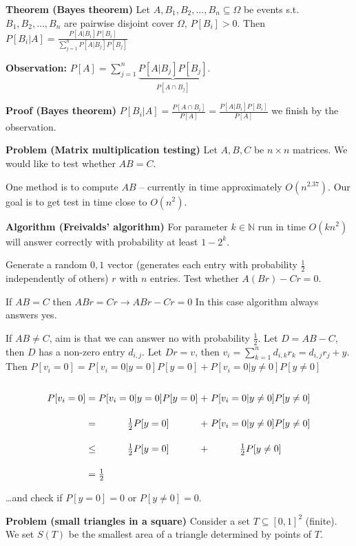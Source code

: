 \documentclass[a4paper]{article}
\begin{document}
\textbf{Theorem (Bayes theorem)}
Let $A, B_1, B_2, \ldots, B_n \subseteq \Omega$ be events s.t. $B_1, B_2, \ldots, B_n$ are pairwise disjoint cover $\Omega$, $P[B_i] > 0$.
Then $P[B_i|A] = \frac{P[A | B_i] P[B_i]}{\sum_{j=1}^n P[A|B_j] P[B_j]}$

\textbf{Observation:}
$P[A] = \sum_{j=1}^n \underbrace{P[A|B_j] P[B_j]}_{P[A \cap B_j]}$.

\textbf{Proof (Bayes theorem)}
$P[B_i|A] = \frac{P[A \cap B_i]}{P[A]} = \frac{P[A|B_i]P[B_i]}{P[A]}$ we finish by the observation.

\textbf{Problem (Matrix multiplication testing)}
Let $A,B,C$ be $n \times n$ matrices.
We would like to test whether $AB = C$.

One method is to compute $AB$ -- currently in time approximately $O(n^{2.37})$.
Our goal is to get test in time close to $O(n^2)$.

\textbf{Algorithm (Freivalds' algorithm)}
For parameter $k \in \mathbb{N}$ run in time $O(k n^2)$ will answer correctly with probability at least $1 - 2^k$.

Generate a random $0,1$ vector (generates each entry with probability $\frac{1}{2}$ independently of others) $r$ with $n$ entries.
Test whether $A(Br) - Cr = 0$.

If $AB = C$ then $ABr = Cr \rightarrow ABr - Cr = 0$
In this case algorithm always answers yes.

If $AB \neq C$, aim is that we can answer no with probability $\frac{1}{2}$.
Let $D = AB - C$, then $D$ has a non-zero entry $d_{i,j}$.
Let $Dr = v$, then $v_i = \sum_{k=1}^n d_{i,k}r_k = d_{i,j} r_j + y$.
Then $P[v_i = 0] = P[v_i = 0 | y = 0] P[y = 0] + P[v_i = 0 | y \neq 0] P[y \neq 0]$

\[\arraycolsep=1.4pt\def\arraystretch{2.2}
\begin{array}{rccc}
	P[v_i = 0] =& P[v_i = 0 | y = 0] P[y = 0] &+& P[v_i = 0 | y \neq 0] P[y \neq 0] \\
	=& \frac{1}{2} P[y=0] &+& P[v_i = 0 | y \neq 0] P[y \neq 0] \\
	\leq& \frac{1}{2} P[y=0] &+& \frac{1}{2} P[y \neq 0] \\
	=& \multicolumn{3}{l}{\frac{1}{2}}
\end{array}
\]
\dots and check if $P[y = 0] = 0$ or $P[y \neq 0] = 0$.

\textbf{Problem (small triangles in a square)}
Consider a set $T \subseteq [0,1]^2$ (finite).
We set $S(T)$ be the smallest area of a triangle determined by points of $T$.
\end{document}
